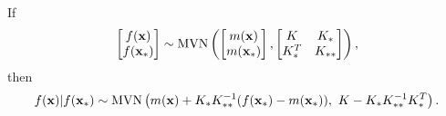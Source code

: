 \begin{theorem}
    \label{thm:cond_mvn}
    If
    $$
        \begin{bmatrix}
            f(\mathbf{x}) \\
            f(\mathbf{x}_*)
        \end{bmatrix} \sim \operatorname{MVN}\left(
        \begin{bmatrix}
                m(\mathbf{x}) \\
                m(\mathbf{x}_*)
            \end{bmatrix}, \begin{bmatrix}
                K       & K_{*}  \\
                K_{*}^T & K_{**}
            \end{bmatrix}
        \right),
    $$
    then
    $$
        f(\mathbf{x}) | f(\mathbf{x}_*)
        \sim \operatorname{MVN}\left(
        m(\mathbf{x}) + K_{*}K_{**}^{-1}(f(\mathbf{x}_*) - m(\mathbf{x}_*)), \,\,
        K - K_{*}K_{**}^{-1}K_{*}^T
        \right).
    $$
\end{theorem}
